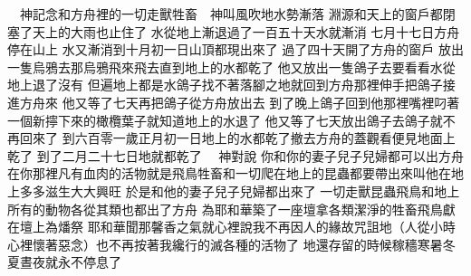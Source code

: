 \bchapter%
　神記念\chientien 和方舟裡的一切走獸牲畜\yuentien 　神叫風吹地\chientien 水勢漸落\chuan 
{}淵源和天上的窗戶\chientien 都閉塞了\chientien 天上的大雨也止住了\chuan 
{}水從地上漸退\yuentien 過了一百五十天\chientien 水就漸消\chuan 
{}七月十七日\chientien 方舟停在山上\chuan 
{}水又漸消\chientien 到十月初一日\chientien 山頂都現出來了\chuan\Chuan
{}過了四十天\chientien{}開了方舟的窗戶\chientien 
{}放出一隻烏鴉去\chientien 那烏鴉飛來飛去\chientien 直到地上的水都乾了\chuan 
{}他又放出一隻鴿子去\chientien 要看看水從地上退了沒有\chuan 
{}但遍地上都是水\chientien 鴿子找不著落腳之地\chientien 就回到方舟那裡\chientien{}伸手把鴿子接進方舟來\chuan 
{}他又等了七天\chientien 再把鴿子從方舟放出去\yuentien 
{}到了晚上\chientien 鴿子回到他那裡\chientien 嘴裡叼著一個新擰下來的橄欖葉子\chientien{}就知道地上的水退了\chuan 
{}他又等了七天\chientien 放出鴿子去\chientien 鴿子就不再回來了\chuan\Chuan
{}到六百零一歲\chientien 正月初一日\chientien 地上的水都乾了\yuentien{}撤去方舟的蓋觀看\chientien 便見地面上乾了\chuan 
{}到了二月二十七日\chientien 地就都乾了\chuan 
{}　神對說\chientien 
{}你和你的妻子\chientien 兒子\chientien 兒婦\chientien 都可以出方舟\chuan 
{}在你那裡凡有血肉的活物\chientien 就是飛鳥\chientien 牲畜\chientien 和一切爬在地上的昆蟲\chientien 都要帶出來\chientien 叫他在地上多多滋生\chientien 大大興旺\chuan 
{}於是和他的妻子\chientien 兒子\chientien 兒婦\chientien 都出來了\chuan 
{}一切走獸\chientien 昆蟲\chientien 飛鳥\chientien 和地上所有的動物\chientien 各從其類\chientien 也都出了方舟\chuan\Chuan
{}為耶和華築了一座壇\chientien 拿各類潔淨的牲畜\chientien 飛鳥\chientien 獻在壇上為燔祭\chuan 
{}耶和華聞那馨香之氣\chientien 就心裡說\chientien 我不再因人的緣故咒詛地\chientien （人從小時心裡懷著惡念）也不再按著我纔行的\chientien 滅各種的活物了\chuan 
{}地還存留的時候\chientien 稼穡\chientien 寒暑\chientien 冬夏\chientien 晝夜\chientien 就永不停息了\chuan 
